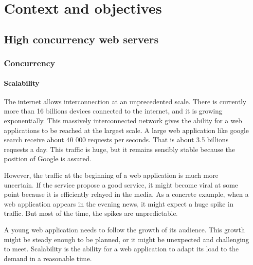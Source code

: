\chapter{Context and objectives}
\minitoc
\eject



\section{High concurrency web servers}

\subsection{Concurrency}

\subsubsection{Scalability}

The internet allows interconnection at an unprecedented scale.
There is currently more than 16 billions devices connected to the internet, and it is growing exponentially.
This massively interconnected network gives the ability for a web applications to be reached at the largest scale.
A large web application like google search receive about 40 000 requests per seconds.
That is about 3.5 billions requests a day.
This traffic is huge, but it remains sensibly stable because the position of Google is assured.


However, the traffic at the beginning of a web application is much more uncertain.
If the service propose a good service, it might become viral at some point because it is efficiently relayed in the media.
As a concrete example, when a web application appears in the evening news, it might expect a huge spike in traffic.
But most of the time, the spikes are unpredictable.

A young web application needs to follow the growth of its audience.
This growth might be steady enough to be planned, or it might be unexpected and challenging to meet.
Scalability is the ability for a web application to adapt its load to the demand in a reasonable time.

